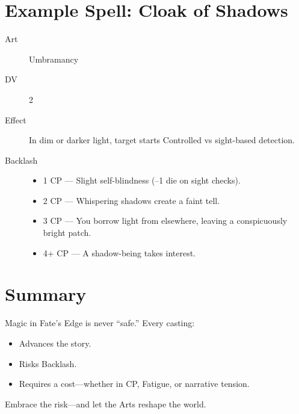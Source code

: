\section{Example Spell: Cloak of Shadows}

\begin{description}
  \item[Art] Umbramancy
  \item[DV] 2
  \item[Effect] In dim or darker light, target starts Controlled vs sight-based detection.
  \item[Backlash]
    \begin{itemize}
      \item 1 CP — Slight self-blindness (–1 die on sight checks).
      \item 2 CP — Whispering shadows create a faint tell.
      \item 3 CP — You borrow light from elsewhere, leaving a conspicuously bright patch.
      \item 4+ CP — A shadow-being takes interest.
    \end{itemize}
\end{description}

\section{Summary}

Magic in Fate’s Edge is never “safe.” Every casting:

\begin{itemize}
  \item Advances the story.
  \item Risks Backlash.
  \item Requires a cost—whether in CP, Fatigue, or narrative tension.
\end{itemize}

Embrace the risk—and let the Arts reshape the world.

